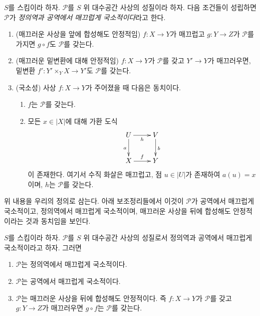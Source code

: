 \begin{definition}
\label{definition-local-source-target}
$S$를 스킴이라 하자. $\mathcal{P}$를 $S$ 위 대수공간 사상의 성질이라
하자. 다음 조건들이 성립하면 $\mathcal{P}$가 {\it 정의역과 공역에서
매끄럽게 국소적이다}라고 한다.
\begin{enumerate}
\item (매끄러운 사상을 앞에 합성해도 안정적임)
$f:X\to Y$가 매끄럽고 $g:Y\to Z$가 $\mathcal{P}$를 가지면
$g\circ f$도 $\mathcal{P}$를 갖는다.
\item (매끄러운 밑변환에 대해 안정적임)
$f:X\to Y$가 $\mathcal{P}$를 갖고 $Y'\to Y$가 매끄러우면, 밑변환
$f':Y'\times_YX\to Y'$도 $\mathcal{P}$를 갖는다.
\item (국소성) 사상 $f:X\to Y$가 주어졌을 때 다음은 동치이다.
\begin{enumerate}
\item $f$는 $\mathcal{P}$를 갖는다.
\item 모든 $x\in|X|$에 대해 가환 도식
$$
\xymatrix{
U \ar[d]_a \ar[r]_h & V \ar[d]^b \\
X \ar[r]^f & Y
}
$$
이 존재한다. 여기서 수직 화살은 매끄럽고, 점 $u\in|U|$가 존재하여
$a(u)=x$이며, $h$는 $\mathcal{P}$를 갖는다.
\end{enumerate}
\end{enumerate}
\end{definition}

\noindent
위 내용을 우리의 정의로 삼는다. 아래 보조정리들에서 이것이
$\mathcal{P}$가 공역에서 매끄럽게 국소적이고, 정의역에서 매끄럽게
국소적이며, 매끄러운 사상을 뒤에 합성해도 안정적이라는 것과 동치임을
보인다.

\begin{lemma}
\label{lemma-local-source-target-implies}
$S$를 스킴이라 하자. $\mathcal{P}$를 $S$ 위 대수공간 사상의 성질로서
정의역과 공역에서 매끄럽게 국소적이라고 하자. 그러면
\begin{enumerate}
\item $\mathcal{P}$는 정의역에서 매끄럽게 국소적이다.
\item $\mathcal{P}$는 공역에서 매끄럽게 국소적이다.
\item $\mathcal{P}$는 매끄러운 사상을 뒤에 합성해도 안정적이다. 즉
$f:X\to Y$가 $\mathcal{P}$를 갖고 $g:Y\to Z$가 매끄러우면
$g\circ f$는 $\mathcal{P}$를 갖는다.
\end{enumerate}
\end{lemma}

